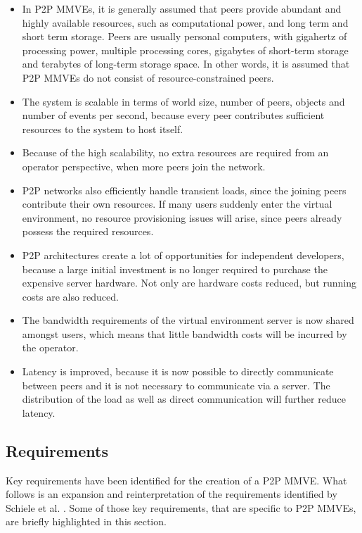\begin{itemize}
\item In P2P MMVEs, it is generally assumed that peers provide abundant and highly available resources, such as computational power, and long term and short term storage. Peers are usually personal computers, with gigahertz of processing power, multiple processing cores, gigabytes of short-term storage and terabytes of long-term storage space. In other words, it is assumed that P2P MMVEs do not consist of resource-constrained peers.

\item The system is scalable in terms of world size, number of peers, objects and number of events per second, because every peer contributes sufficient resources to the system to host itself.

\item Because of the high scalability, no extra resources are required from an operator perspective, when more peers join the network.

\item P2P networks also efficiently handle transient loads, since the joining peers contribute their own resources. If many users suddenly enter the virtual environment, no resource provisioning issues will arise, since peers already possess the required resources.

\item P2P architectures create a lot of opportunities for independent developers, because a large initial investment is no longer required to purchase
the expensive server hardware. Not only are hardware costs reduced, but running costs are also reduced.

\item The bandwidth requirements of the virtual environment server is now shared amongst users, which means that little bandwidth costs will be incurred by the operator.

\item Latency is improved, because it is now possible to directly communicate between peers and it is not necessary to communicate via a server. The distribution of the load as well as direct communication will further reduce latency.
\end{itemize}

\subsection{Requirements}

Key requirements have been identified for the creation of a P2P MMVE. What follows is an expansion and reinterpretation of the requirements identified by Schiele et al. \cite{Schiele_p2p_requirements}. Some of those key requirements, that are specific to P2P MMVEs, are briefly highlighted in this section.

